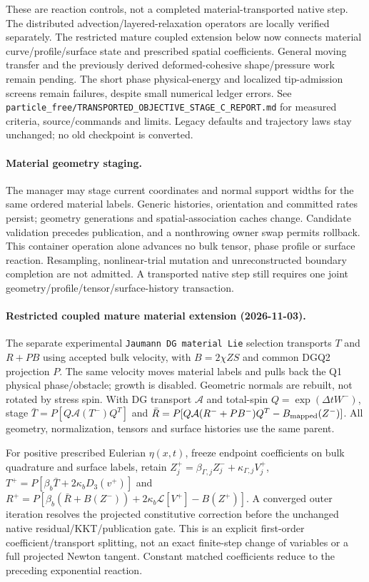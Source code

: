 \documentclass[11pt]{article}
\begin{document}
These are reaction controls, not a completed material-transported native step.
The distributed advection/layered-relaxation operators are locally verified
separately. The restricted mature coupled extension below now connects
material curve/profile/surface state and prescribed spatial coefficients.
General moving transfer and the previously derived deformed-cohesive
shape/pressure work remain pending. The short phase physical-energy and
localized tip-admission screens remain failures, despite small numerical
ledger errors. See
\texttt{particle\_free/TRANSPORTED\_OBJECTIVE\_STAGE\_C\_REPORT.md} for measured
criteria, source/commands and limits. Legacy defaults and trajectory laws stay
unchanged; no old checkpoint is converted.

\paragraph{Material geometry staging.}
The manager may stage current coordinates and normal support widths for the
same ordered material labels. Generic histories, orientation and committed
rates persist; geometry generations and spatial-association caches change.
Candidate validation precedes publication, and a nonthrowing owner swap permits
rollback. This container operation alone advances no bulk tensor, phase profile
or surface reaction. Resampling, nonlinear-trial mutation and unreconstructed
boundary completion are not admitted. A transported native step still requires
one joint geometry/profile/tensor/surface-history transaction.


\paragraph{Restricted coupled mature material extension (2026-11-03).}
The separate experimental \texttt{Jaumann DG material Lie} selection transports
$T$ and $R+PB$ using accepted bulk velocity, with $B=2\chi ZS$ and common DGQ2
projection $P$. The same velocity moves material labels and pulls back the Q1
physical phase/obstacle; growth is disabled. Geometric normals are rebuilt,
not rotated by stress spin. With DG transport $\mathcal A$ and total-spin
$Q=\exp(\Delta t W^-)$, stage
$\bar T=P[Q\mathcal A(T^-)Q^T]$ and
$\bar R=P[Q\mathcal A(R^-+PB^-)Q^T-B_{\rm mapped}(Z^-)]$.
All geometry, normalization, tensors and surface histories use the same parent.

For positive prescribed Eulerian $\eta(x,t)$, freeze endpoint coefficients on
bulk quadrature and surface labels, retain
$Z_j^+=\beta_{\Gamma,j}Z_j^-+\kappa_{\Gamma,j}V_j^+$,
$T^+=P[\beta_b\bar T+2\kappa_bD_3(v^+)]$ and
$R^+=P[\beta_b(\bar R+B(Z^-))+2\kappa_b\mathcal L[V^+]-B(Z^+)]$.
A converged outer iteration resolves the projected constitutive correction
before the unchanged native residual/KKT/publication gate. This is an explicit
first-order coefficient/transport splitting, not an exact finite-step change
of variables or a full projected Newton tangent. Constant matched coefficients
reduce to the preceding exponential reaction.
\end{document}
